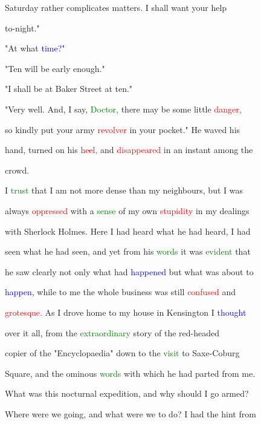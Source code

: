  Saturday rather complicates matters. I shall want your help

 to-night."



 "At what \textcolor{blue}{time?"}



 "Ten will be early enough."



 "I shall be at Baker Street at ten."



 "Very well. And, I say, \textcolor{green}{Doctor,} there may be some little \textcolor{red}{danger,}

 so kindly put your army \textcolor{red}{revolver} in your pocket." He waved his

 hand, turned on his \textcolor{red}{heel,} and \textcolor{red}{disappeared} in an instant among the

 crowd.



 I \textcolor{green}{trust} that I am not more dense than my neighbours, but I was

 always \textcolor{red}{oppressed} with a \textcolor{green}{sense} of my own \textcolor{red}{stupidity} in my dealings

 with Sherlock Holmes. Here I had heard what he had heard, I had

 seen what he had seen, and yet from his \textcolor{green}{words} it was \textcolor{green}{evident} that

 he saw clearly not only what had \textcolor{blue}{happened} but what was about to

 \textcolor{blue}{happen,} while to me the whole business was still \textcolor{red}{confused} and

 \textcolor{red}{grotesque.} As I drove home to my house in Kensington I \textcolor{blue}{thought}

 over it all, from the \textcolor{green}{extraordinary} story of the red-headed

 copier of the "Encyclopaedia" down to the \textcolor{green}{visit} to Saxe-Coburg

 Square, and the \textcolor{BurntOrange}{ominous} \textcolor{green}{words} with which he had parted from me.

 What was this nocturnal \textcolor{BurntOrange}{expedition,} and why should I go armed?

 Where were we going, and what were we to do? I had the hint from


